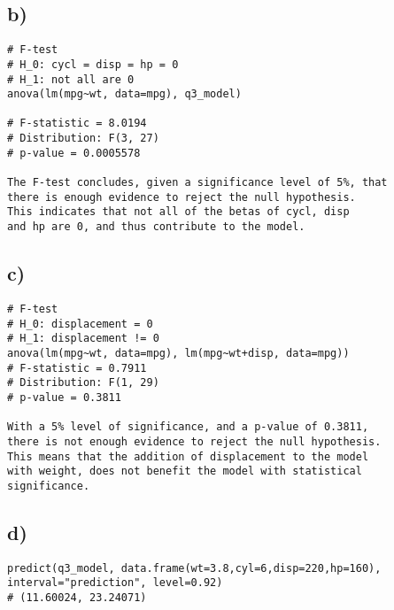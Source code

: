 \documentclass{article}
\begin{document}
\subsection*{b)}
\begin{verbatim}
# F-test
# H_0: cycl = disp = hp = 0
# H_1: not all are 0
anova(lm(mpg~wt, data=mpg), q3_model)
    
# F-statistic = 8.0194
# Distribution: F(3, 27)
# p-value = 0.0005578

The F-test concludes, given a significance level of 5%, that
there is enough evidence to reject the null hypothesis.
This indicates that not all of the betas of cycl, disp
and hp are 0, and thus contribute to the model.
\end{verbatim}

\subsection*{c)}
\begin{verbatim}
# F-test
# H_0: displacement = 0
# H_1: displacement != 0
anova(lm(mpg~wt, data=mpg), lm(mpg~wt+disp, data=mpg))
# F-statistic = 0.7911
# Distribution: F(1, 29)
# p-value = 0.3811

With a 5% level of significance, and a p-value of 0.3811,
there is not enough evidence to reject the null hypothesis.
This means that the addition of displacement to the model
with weight, does not benefit the model with statistical
significance. 
\end{verbatim}

\subsection*{d)}
\begin{verbatim}
predict(q3_model, data.frame(wt=3.8,cyl=6,disp=220,hp=160), interval="prediction", level=0.92)
# (11.60024, 23.24071)
\end{verbatim}
\end{document}
